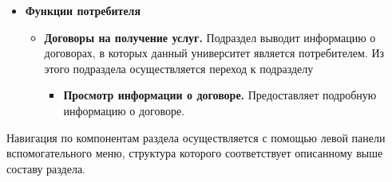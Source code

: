 \begin{itemize}
	\item \textbf{Функции потребителя}
	\begin{itemize}
		\item \textbf{Договоры на получение услуг.} Подраздел выводит информацию о договорах, в которых данный университет является потребителем. Из этого подраздела осуществляется переход к подразделу
		\begin{itemize}
			\item \textbf{Просмотр информации о договоре.} Предоставляет подробную информацию о договоре.
		\end{itemize}
	\end{itemize}
\end{itemize}

Навигация по компонентам раздела осуществляется с помощью левой панели вспомогательного меню, структура которого соответствует описанному выше составу раздела.

